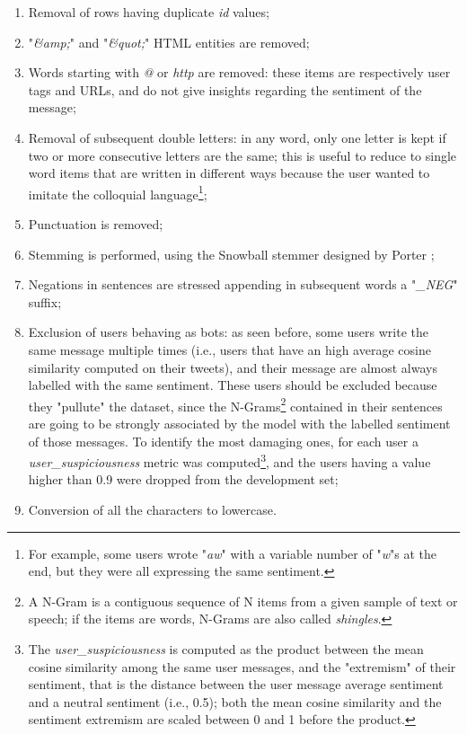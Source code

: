 \documentclass[conference]{IEEEtran}
\begin{document}
\begin{enumerate}
    \item Removal of rows having duplicate \textit{id} values;
    \item "\textit{\&amp;}" and "\textit{\&quot;}" HTML entities are removed; 
    \item Words starting with \textit{@} or \textit{http} are removed: these items are respectively user tags and URLs, and do not give insights regarding the sentiment of the message; 
    \item Removal of subsequent double letters: in any word, only one letter is kept if two or more consecutive letters are the same; this is useful to reduce to single word items that are written in different ways because the user wanted to imitate the colloquial language\footnote{For example, some users wrote "\textit{aw}" with a variable number of "\textit{w}"s at the end, but they were all expressing the same sentiment.};
    \item Punctuation is removed;
    \item Stemming is performed, using the Snowball stemmer designed by Porter \cite{Porter2006};
    \item Negations in sentences are stressed appending in subsequent words a "\textit{\_NEG}" suffix;
    \item Exclusion of users behaving as bots: as seen before, some users write the same message multiple times (i.e., users that have an high average cosine similarity computed on their tweets), and their message are almost always labelled with the same sentiment. These users should be excluded because they "pullute" the dataset, since the N-Grams\footnote{A N-Gram is a contiguous sequence of N items from a given sample of text or speech; if the items are words, N-Grams are also called \textit{shingles}.} contained in their sentences are going to be strongly associated by the model with the labelled sentiment of those messages. To identify the most damaging ones, for each user a \textit{user\_suspiciousness} metric was computed\footnote{The \textit{user\_suspiciousness} is computed as the product between the mean cosine similarity among the same user messages, and the "extremism" of their sentiment, that is the distance between the user message average sentiment and a neutral sentiment (i.e., 0.5); both the mean cosine similarity and the sentiment extremism are scaled between 0 and 1 before the product.}, and the users having a value higher than 0.9 were dropped from the development set;
    \item Conversion of all the characters to lowercase.
\end{enumerate}
\end{document}
